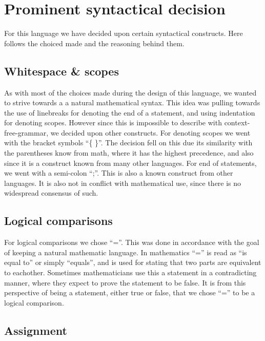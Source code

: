 \chapter{Prominent syntactical decision}

For this language we have decided upon certain syntactical constructs. Here follows the choiced made and the reasoning behind them.



\section{Whitespace & scopes}

As with most of the choices made during the design of this language, we wanted to strive towards a a natural mathematical syntax. This idea was pulling towards the use of linebreaks for denoting the end of a statement, and using indentation for denoting scopes. However since this is impossible to describe with context-free-grammar, we decided upon other constructs. For denoting scopes we went with the bracket symbols \enquote{\{ \}}. The decision fell on this due its similarity with the parentheses know from math, where it has the highest precedence, and also since it is a construct known from many other languages. For end of statements, we went with a semi-colon \enquote{;}. This is also a known construct from other languages. It is also not in conflict with mathematical use, since there is no widespread consensus of such.


\section{Logical comparisons}

For logical comparisons we chose \enquote{=}. This was done in accordance with the goal of keeping a natural mathematic language. In mathematics \enquote{=} is read as \enquote{is equal to} or simply \enquote{equals}, and is used for stating that two parts are equivalent to eachother. Sometimes mathematicians use this a statement in a contradicting manner, where they expect to prove the statement to be false. It is from this perspective of being a statement, either true or false, that we chose \enquote{=} to be a logical comparison.


\section{Assignment}

